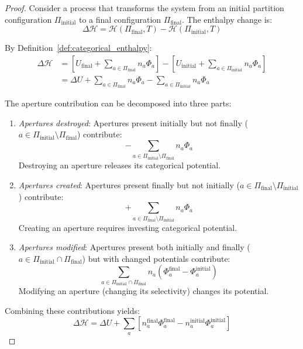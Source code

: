 \documentclass[12pt,a4paper]{article}
\theoremstyle{definition}
\theoremstyle{remark}
\begin{document}
\begin{proof}
Consider a process that transforms the system from an initial partition configuration $\Pi_{\text{initial}}$ to a final configuration $\Pi_{\text{final}}$. The enthalpy change is:
\begin{equation}
\Delta\mathcal{H} = \mathcal{H}(\Pi_{\text{final}}, T) - \mathcal{H}(\Pi_{\text{initial}}, T)
\end{equation}

By Definition~\ref{def:categorical_enthalpy}:
\begin{align}
\Delta\mathcal{H} &= \left[ U_{\text{final}} + \sum_{a \in \Pi_{\text{final}}} n_a \Phi_a \right] - \left[ U_{\text{initial}} + \sum_{a \in \Pi_{\text{initial}}} n_a \Phi_a \right] \\
&= \Delta U + \sum_{a \in \Pi_{\text{final}}} n_a \Phi_a - \sum_{a \in \Pi_{\text{initial}}} n_a \Phi_a
\end{align}

The aperture contribution can be decomposed into three parts:
\begin{enumerate}
    \item \emph{Apertures destroyed}: Apertures present initially but not finally ($a \in \Pi_{\text{initial}} \setminus \Pi_{\text{final}}$) contribute:
    \begin{equation}
    -\sum_{a \in \Pi_{\text{initial}} \setminus \Pi_{\text{final}}} n_a \Phi_a
    \end{equation}
    Destroying an aperture releases its categorical potential.
    
    \item \emph{Apertures created}: Apertures present finally but not initially ($a \in \Pi_{\text{final}} \setminus \Pi_{\text{initial}}$) contribute:
    \begin{equation}
    +\sum_{a \in \Pi_{\text{final}} \setminus \Pi_{\text{initial}}} n_a \Phi_a
    \end{equation}
    Creating an aperture requires investing categorical potential.
    
    \item \emph{Apertures modified}: Apertures present both initially and finally ($a \in \Pi_{\text{initial}} \cap \Pi_{\text{final}}$) but with changed potentials contribute:
    \begin{equation}
    \sum_{a \in \Pi_{\text{initial}} \cap \Pi_{\text{final}}} n_a (\Phi_a^{\text{final}} - \Phi_a^{\text{initial}})
    \end{equation}
    Modifying an aperture (changing its selectivity) changes its potential.
\end{enumerate}

Combining these contributions yields:
\begin{equation}
\Delta\mathcal{H} = \Delta U + \sum_a \left[ n_a^{\text{final}} \Phi_a^{\text{final}} - n_a^{\text{initial}} \Phi_a^{\text{initial}} \right]
\end{equation}
\end{proof}
\end{document}
